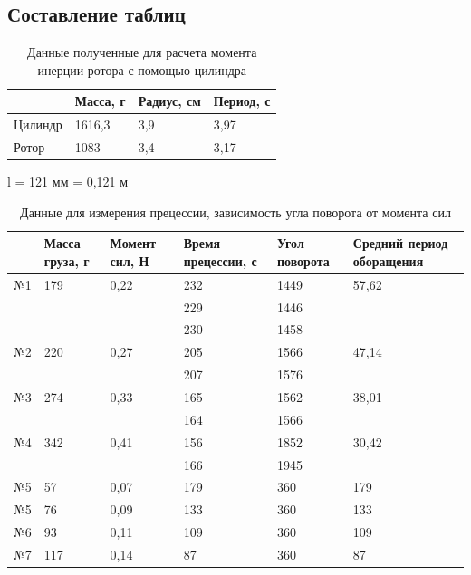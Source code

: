 \documentclass[a4paper]{article}
\begin{document}
\subsection{Составление таблиц}

\begin{table}[!h]
    \begin{center}
    \begin{tabular}{|l|l|l|l|}
    \hline
            & Масса, г & Радиус, см & Период, с \\ \hline
    Цилиндр & 1616,3   & 3,9        & 3,97      \\ \hline
    Ротор   & 1083     & 3,4        & 3,17      \\ \hline
    \end{tabular}
    \caption{Данные полученные для расчета момента инерции ротора с помощью цилиндра}
    \end{center}
    \end{table}
l = 121 мм = 0,121 м
\begin{table}[!h]
    \begin{center}
    \begin{tabular}{|l|l|l|l|l|l|}
    \hline
        & Масса груза, г &Момент сил, Н & Время прецессии, с & Угол поворота & Средний период оборащения\\ \hline
    №1& 179               & 0,22          & 232          &1449        &57,62      \\ \hline
      &                   &              & 229           &1446  \\ \hline
      &                &                 & 230           &1458  \\ \hline
    №2& 220            & 0,27           & 205           &1566         & 47,14 \\ \hline
      &                &                 & 207           &1576  \\ \hline
    №3&274             & 0,33           & 165           &1562         & 38,01 \\ \hline
      &                &                 & 164           &1566  \\ \hline
    №4&342             & 0,41           & 156           &1852         & 30,42 \\ \hline
      &                &                 & 166           &1945  \\ \hline
    №5&57              & 0,07           & 179           &360          & 179 \\ \hline
    №5&76              & 0,09           & 133           &360          & 133 \\ \hline
    №6&93              & 0,11           & 109           &360          & 109 \\ \hline
    №7&117             & 0,14           & 87            &360          & 87 \\ \hline
    \end{tabular}
    \caption{Данные для измерения прецессии, зависимость угла поворота от момента сил}
    \end{center}
    \end{table}
\end{document}
